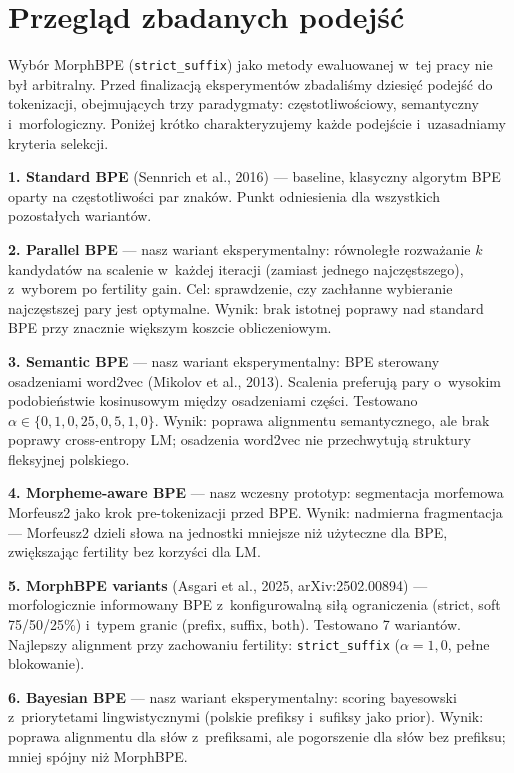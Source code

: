\section{Przegląd zbadanych podejść}
\label{sec:exploration}

Wybór MorphBPE (\texttt{strict\_suffix}) jako metody ewaluowanej
w~tej pracy nie był arbitralny. Przed finalizacją eksperymentów
zbadaliśmy dziesięć podejść do tokenizacji, obejmujących trzy
paradygmaty: częstotliwościowy, semantyczny i~morfologiczny.
Poniżej krótko charakteryzujemy każde podejście i~uzasadniamy
kryteria selekcji.

\textbf{1. Standard BPE} (Sennrich et al., 2016) --- baseline,
klasyczny algorytm BPE oparty na częstotliwości par znaków.
Punkt odniesienia dla wszystkich pozostałych wariantów.

\textbf{2. Parallel BPE} --- nasz wariant eksperymentalny:
równoległe rozważanie $k$ kandydatów na scalenie w~każdej
iteracji (zamiast jednego najczęstszego), z~wyborem po
fertility gain. Cel: sprawdzenie, czy zachłanne wybieranie
najczęstszej pary jest optymalne. Wynik: brak istotnej
poprawy nad standard BPE przy znacznie większym koszcie
obliczeniowym.

\textbf{3. Semantic BPE} --- nasz wariant eksperymentalny:
BPE sterowany osadzeniami word2vec (Mikolov et al., 2013).
Scalenia preferują pary o~wysokim podobieństwie kosinusowym
między osadzeniami części. Testowano $\alpha \in \{0{,}1,
0{,}25, 0{,}5, 1{,}0\}$. Wynik: poprawa alignmentu semantycznego,
ale brak poprawy cross-entropy LM; osadzenia word2vec nie
przechwytują struktury fleksyjnej polskiego.

\textbf{4. Morpheme-aware BPE} --- nasz wczesny prototyp:
segmentacja morfemowa Morfeusz2 jako krok pre-tokenizacji
przed BPE. Wynik: nadmierna fragmentacja --- Morfeusz2 dzieli
słowa na jednostki mniejsze niż użyteczne dla BPE, zwiększając
fertility bez korzyści dla LM.

\textbf{5. MorphBPE variants} (Asgari et al., 2025,
arXiv:2502.00894) --- morfologicznie informowany BPE
z~konfigurowalną siłą ograniczenia (strict, soft 75/50/25\%)
i~typem granic (prefix, suffix, both). Testowano 7 wariantów.
Najlepszy alignment przy zachowaniu fertility: \texttt{strict\_suffix}
($\alpha = 1{,}0$, pełne blokowanie).

\textbf{6. Bayesian BPE} --- nasz wariant eksperymentalny:
scoring bayesowski z~priorytetami lingwistycznymi (polskie
prefiksy i~sufiksy jako prior). Wynik: poprawa alignmentu
dla słów z~prefiksami, ale pogorszenie dla słów bez prefiksu;
mniej spójny niż MorphBPE.

